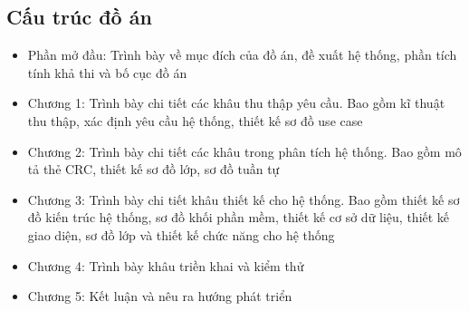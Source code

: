 \subsection*{Cấu trúc đồ án}

\begin{adjustwidth}{1.5em}{}
\begin{itemize}
  \item Phần mở đầu: Trình bày về mục đích của đồ án, đề xuất hệ thống, phần tích tính khả thi và bố cục đồ án
  \item Chương 1: Trình bày chi tiết các khâu thu thập yêu cầu. Bao gồm kĩ thuật thu thập, xác định yêu cầu hệ thống, thiết kế sơ đồ use case
  \item Chương 2: Trình bày chi tiết các khâu trong phân tích hệ thống. Bao gồm mô tả thẻ CRC, thiết kế sơ đồ lớp, sơ đồ tuần tự
  \item Chương 3: Trình bày chi tiết khâu thiết kế cho hệ thống. Bao gồm thiết kế sơ đồ kiến trúc hệ thống, sơ đồ khối
  phần mềm, thiết kế cơ sở dữ liệu, thiết kế giao diện, sơ đồ lớp và thiết kế chức năng cho hệ thống
  \item Chương 4: Trình bày khâu triền khai và kiểm thử
  \item Chương 5: Kết luận và nêu ra hướng phát triển
\end{itemize}
\end{adjustwidth}

\cleardoublepage

